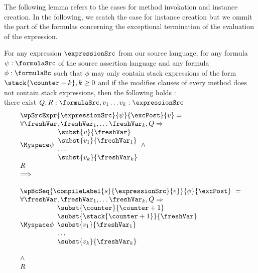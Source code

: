 The following lemma refers to the cases for method invokation and instance creation. In the following, we scatch the case for 
instance creation but we ommit the part of the formulas concerning the exceptional termination of the evaluation of
 the expression. 
\begin{exprSrcBcWp2} \label{pogEq:aux:exprSrcBcWp}
 For any expression $\expressionSrc$ from our source language, for any formula $\psi: \formulaSrc$  
of the source assertion language and any formula $\phi: \formulaBc$ such that $\phi$ may only 
contain stack expressions of the form     $\stack{\counter - k}, k \ge 0$ and if the modifies clauses of every
 method does not contain stack expressions, then the following holds : \\
there exist $ Q,R:\formulaSrc, v_1 \ldots v_k :\expressionSrc $
$$ \begin{array}{l} \wpSrcExpr{\expressionSrc }{ \psi }{ \excPost}{v} = \\
 \forall \freshVar, \freshVar_1, \ldots  \freshVar_k   ,  Q \Rightarrow \\
 \Myspace \psi 
                                                                             \begin{array}{l}
									         \subst{v }{ \freshVar }  \\
									        \subst{v_1 }{ \freshVar_1 }  \\
										\ldots \\
										\subst{v_k}{ \freshVar_k } 
									     \end{array}
          \wedge \\ 
	  R  

      
  \\
 \Longrightarrow \\
 \\

  
	    \wpBcSeq{ \compileLabel{s}{\expressionSrc}{e} }{ \phi }{\excPost} \  = \\ 
            \forall \freshVar, \freshVar_1, \ldots  \freshVar_k ,   Q \Rightarrow \\
	                      \Myspace \phi \begin{array}{l}
                                       \subst{\counter}{\counter + 1}\\
			               \subst{\stack{\counter +1}}{\freshVar  }\\
				       \subst{v_1 }{ \freshVar_1 }  \\
				       \ldots \\
				       \subst{v_k}{ \freshVar_k } 
                         \end{array} \\ \\
          \wedge \\ 
	  R 
  \end{array}$$
\end{exprSrcBcWp2}


